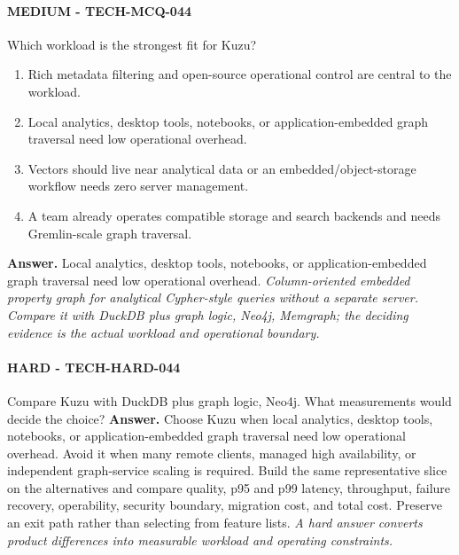 \paragraph{MEDIUM - TECH-MCQ-044} Which workload is the strongest fit for Kuzu?
\begin{enumerate}[label=\Alph*.]
\item Rich metadata filtering and open-source operational control are central to the workload.
\item Local analytics, desktop tools, notebooks, or application-embedded graph traversal need low operational overhead.
\item Vectors should live near analytical data or an embedded/object-storage workflow needs zero server management.
\item A team already operates compatible storage and search backends and needs Gremlin-scale graph traversal.
\end{enumerate}
\textbf{Answer.} Local analytics, desktop tools, notebooks, or application-embedded graph traversal need low operational overhead.
\textit{Column-oriented embedded property graph for analytical Cypher-style queries without a separate server. Compare it with DuckDB plus graph logic, Neo4j, Memgraph; the deciding evidence is the actual workload and operational boundary.}
\paragraph{HARD - TECH-HARD-044} Compare Kuzu with DuckDB plus graph logic, Neo4j. What measurements would decide the choice?
\textbf{Answer.} Choose Kuzu when local analytics, desktop tools, notebooks, or application-embedded graph traversal need low operational overhead. Avoid it when many remote clients, managed high availability, or independent graph-service scaling is required. Build the same representative slice on the alternatives and compare quality, p95 and p99 latency, throughput, failure recovery, operability, security boundary, migration cost, and total cost. Preserve an exit path rather than selecting from feature lists.
\textit{A hard answer converts product differences into measurable workload and operating constraints.}

